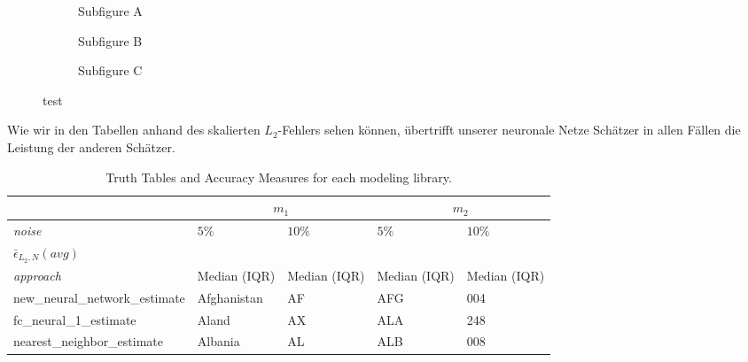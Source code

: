 \begin{figure}
    \begin{subfigure}[b]{0.5\textwidth}
        \centering
        \scalebox{0.9}{
          }
        \caption{Subfigure A}
        \label{fig:subfig8}
    \end{subfigure}
    \begin{subfigure}[b]{0.5\textwidth}
    \centering
    \scalebox{0.9}{
           }
        \caption{Subfigure B}   
        \label{fig:subfig9}
    \end{subfigure}
       \hspace{0.4cm}
    \begin{subfigure}[b]{1\textwidth}
    \centering
    \scalebox{0.9}{
	}
	 \caption{Subfigure C}
        \label{fig:subfig810}
    \end{subfigure}
    \caption{test} 
\label{fig:subfig1.a.4}
\end{figure}

\begin{figure}
\centering
%
\end{figure}

Wie wir in den Tabellen anhand des skalierten $L_2$-Fehlers sehen können, übertrifft unserer neuronale Netze Schätzer in allen Fällen die Leistung der anderen Schätzer. 

\begin{table}
\centering
\begin{tabular}{ |p{5cm}||p{2cm}|p{2cm}|p{2cm}|p{2cm}|  }
 \hline
 & \multicolumn{2}{|c|}{$m_1$} & \multicolumn{2}{|c|}{$m_2$}\\
 \hline
 \textit{noise}& $5\%$ & $10\%$ & $5\%$ & $10\%$ \\
 \hline
 $\bar{\epsilon}_{L_2,N}(avg)$&  &  &  &  \\
 \hline
 \textit{approach}& \footnotesize Median (IQR) & \footnotesize Median (IQR)  & \footnotesize Median (IQR)  & \footnotesize Median (IQR)  \\
 \hline
 new\_neural\_network\_estimate & Afghanistan   & AF    &AFG&   004\\
 fc\_neural\_1\_estimate & Aland &   AX  & ALA   &248\\
 nearest\_neighbor\_estimate & Albania &AL & ALB&  008\\
 \hline
\end{tabular}
    \caption{Truth Tables and Accuracy Measures for each modeling library.}
    \label{tab:truthTables}   
\end{table}
